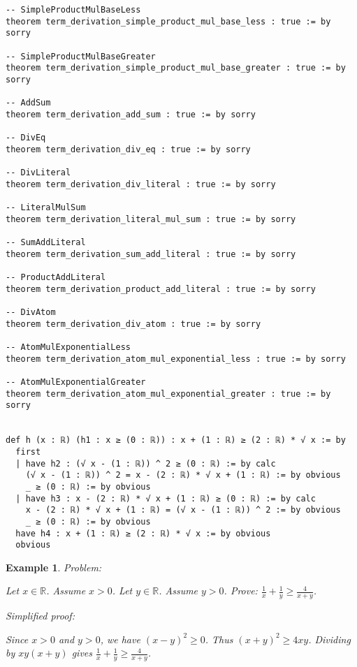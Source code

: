 \documentclass{article}
\newtheorem{example}{Example}
\begin{document}
\begin{tcolorbox}[colback=white!10, width=\linewidth]
\begin{lstlisting}[language=Lean4]
-- SimpleProductMulBaseLess
theorem term_derivation_simple_product_mul_base_less : true := by sorry

-- SimpleProductMulBaseGreater
theorem term_derivation_simple_product_mul_base_greater : true := by sorry

-- AddSum
theorem term_derivation_add_sum : true := by sorry

-- DivEq
theorem term_derivation_div_eq : true := by sorry

-- DivLiteral
theorem term_derivation_div_literal : true := by sorry

-- LiteralMulSum
theorem term_derivation_literal_mul_sum : true := by sorry

-- SumAddLiteral
theorem term_derivation_sum_add_literal : true := by sorry

-- ProductAddLiteral
theorem term_derivation_product_add_literal : true := by sorry

-- DivAtom
theorem term_derivation_div_atom : true := by sorry

-- AtomMulExponentialLess
theorem term_derivation_atom_mul_exponential_less : true := by sorry

-- AtomMulExponentialGreater
theorem term_derivation_atom_mul_exponential_greater : true := by sorry


def h (x : ℝ) (h1 : x ≥ (0 : ℝ)) : x + (1 : ℝ) ≥ (2 : ℝ) * √ x := by
  first
  | have h2 : (√ x - (1 : ℝ)) ^ 2 ≥ (0 : ℝ) := by calc
    (√ x - (1 : ℝ)) ^ 2 = x - (2 : ℝ) * √ x + (1 : ℝ) := by obvious
    _ ≥ (0 : ℝ) := by obvious
  | have h3 : x - (2 : ℝ) * √ x + (1 : ℝ) ≥ (0 : ℝ) := by calc
    x - (2 : ℝ) * √ x + (1 : ℝ) = (√ x - (1 : ℝ)) ^ 2 := by obvious
    _ ≥ (0 : ℝ) := by obvious
  have h4 : x + (1 : ℝ) ≥ (2 : ℝ) * √ x := by obvious
  obvious

\end{lstlisting}
\end{tcolorbox}


\begin{example}
Problem:
\begin{tcolorbox}[colback=yellow!10, width=\linewidth]
Let $x\in\mathbb{R}$. Assume $x>0$.
    Let $y\in\mathbb{R}$. Assume $y>0$.
    Prove: $\frac{1}{x} + \frac{1}{y} \ge \frac{4}{x+y}$.
\end{tcolorbox}

Simplified proof:
\begin{tcolorbox}[colback=blue!10, width=\linewidth]
Since $x>0$ and $y>0$, we have $(x-y)^2 \ge 0$. Thus $(x+y)^2 \ge 4xy$. Dividing by $xy(x+y)$ gives $\frac{1}{x}+\frac{1}{y} \ge \frac{4}{x+y}$.
\end{tcolorbox}
\end{example}
\end{document}
